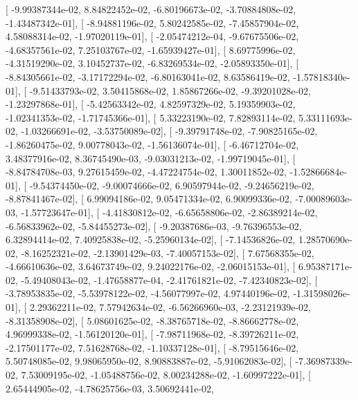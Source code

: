 \documentclass{article}
\begin{document}
       [ -9.99387344e-02,   8.84822452e-02,  -6.80196673e-02,
         -3.70884808e-02,  -1.43487342e-01],
       [ -8.94881196e-02,   5.80242585e-02,  -7.45857904e-02,
          4.58088314e-02,  -1.97020119e-01],
       [ -2.05474212e-04,  -9.67675506e-02,  -4.68357561e-02,
          7.25103767e-02,  -1.65939427e-01],
       [  8.69775996e-02,  -4.31519290e-02,   3.10452737e-02,
         -6.83269534e-02,  -2.05893350e-01],
       [ -8.84305661e-02,  -3.17172294e-02,  -6.80163041e-02,
          8.63586419e-02,  -1.57818340e-01],
       [ -9.51433793e-02,   3.50415868e-02,   1.85867266e-02,
         -9.39201028e-02,  -1.23297868e-01],
       [ -5.42563342e-02,   4.82597329e-02,   5.19359903e-02,
         -1.02341353e-02,  -1.71745366e-01],
       [  5.33223190e-02,   7.82893114e-02,   5.33111693e-02,
         -1.03266691e-02,  -3.53750089e-02],
       [ -9.39791748e-02,  -7.90825165e-02,  -1.86260475e-02,
          9.00778043e-02,  -1.56136074e-01],
       [ -6.46712704e-02,   3.48377916e-02,   8.36745490e-03,
         -9.03031213e-02,  -1.99719045e-01],
       [ -8.84784708e-03,   9.27615459e-02,  -4.47224754e-02,
          1.30011852e-02,  -1.52866684e-01],
       [ -9.54374450e-02,  -9.00074666e-02,   6.90597944e-02,
         -9.24656219e-02,  -8.87841467e-02],
       [  6.99094186e-02,   9.05471334e-02,   6.90099336e-02,
         -7.00089603e-03,  -1.57723647e-01],
       [ -4.41830812e-02,  -6.65658806e-02,  -2.86389214e-02,
         -6.56833962e-02,  -5.84455273e-02],
       [ -9.20387686e-03,  -9.76396553e-02,   6.32894414e-02,
          7.40925838e-02,  -5.25960134e-02],
       [ -7.14536826e-02,   1.28570690e-02,  -8.16252321e-02,
         -2.13901429e-03,  -7.40057153e-02],
       [  7.67568355e-02,  -4.66610636e-02,   3.64673749e-02,
          9.24022176e-02,  -2.06015153e-01],
       [  6.95387171e-02,  -5.49408043e-02,  -1.47658877e-04,
         -2.41761821e-02,  -7.42340823e-02],
       [ -3.78953835e-02,  -5.53978122e-02,  -4.56077997e-02,
          4.97440196e-02,  -1.31598026e-01],
       [  2.29362211e-02,   7.57942634e-02,  -6.56266960e-03,
         -2.23121939e-02,  -8.31358908e-02],
       [  5.08601625e-02,  -8.38765718e-02,  -8.86662778e-02,
          4.96999338e-02,  -1.56120120e-01],
       [ -7.98711968e-02,  -8.39726211e-02,  -2.17501177e-02,
          7.51628768e-02,  -1.10337128e-01],
       [ -8.79515646e-02,   5.50748085e-02,   9.98065950e-02,
          8.90883887e-02,  -5.91062083e-02],
       [ -7.36987339e-02,   7.53009195e-02,  -1.05488756e-02,
          8.00234288e-02,  -1.60997222e-01],
       [  2.65444905e-02,  -4.78625756e-03,   3.50692441e-02,
\end{document}
